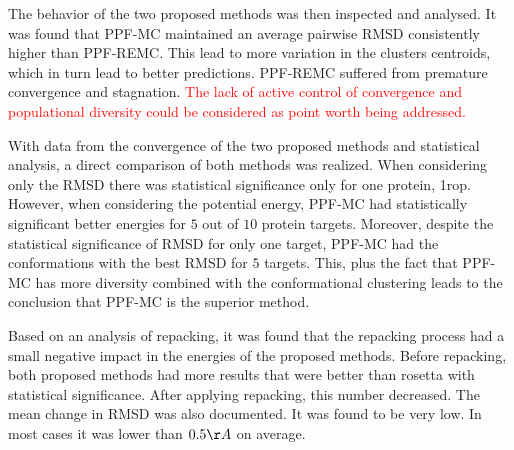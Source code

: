 The behavior of the two proposed methods was then inspected and analysed. It was
found that PPF-MC maintained an average pairwise RMSD consistently higher than PPF-REMC.
This lead to more variation in the clusters centroids, which in turn lead to
better predictions. PPF-REMC suffered from premature convergence and stagnation.
\textcolor{red}{
The lack of active control of convergence and populational diversity could be
considered as point worth being addressed.
}

With data from the convergence of the two proposed methods and statistical
analysis, a direct comparison of both methods was realized. When considering
only the RMSD there was statistical significance only for one protein, 1rop.
However, when considering the potential energy, PPF-MC had statistically
significant better energies for $5$ out of $10$ protein targets. Moreover,
despite the statistical significance of RMSD for only one target, PPF-MC had
the conformations with the best RMSD for $5$ targets. This, plus the fact that
PPF-MC has more diversity combined with the conformational clustering leads to
the conclusion that PPF-MC is the superior method. 

Based on an analysis of repacking, it was found that
the repacking process had a small negative impact in the energies of the
proposed methods. Before repacking, both proposed methods had more results that
were better than rosetta with statistical significance. After applying repacking,
this number decreased. The mean change in RMSD was also documented. It was found
to be very low. In most cases it was lower than $0.5\AA$ on average.

